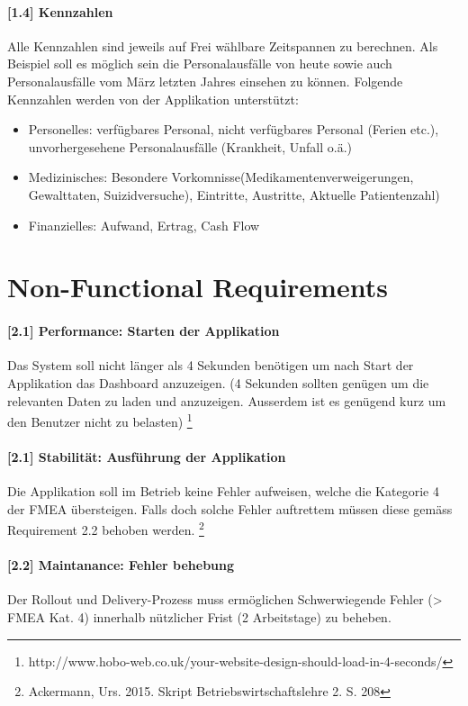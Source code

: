 \documentclass[a4paper]{scrreprt}
\begin{document}
\paragraph{[1.4] Kennzahlen}
Alle Kennzahlen sind jeweils auf Frei wählbare Zeitspannen zu berechnen. Als Beispiel soll es möglich sein die Personalausfälle von heute sowie auch Personalausfälle vom März letzten Jahres einsehen zu können. Folgende Kennzahlen werden von der Applikation unterstützt:
\begin{itemize}
\item Personelles: verfügbares Personal, nicht verfügbares Personal (Ferien etc.), unvorhergesehene Personalausfälle (Krankheit, Unfall o.ä.)\\
\item Medizinisches: Besondere Vorkomnisse(Medikamentenverweigerungen, Gewalttaten, Suizidversuche), Eintritte, Austritte, Aktuelle Patientenzahl) \\
\item Finanzielles: Aufwand, Ertrag, Cash Flow\\
\end{itemize}

\section{Non-Functional Requirements}
\paragraph{[2.1] Performance: Starten der Applikation}
Das System soll nicht länger als 4 Sekunden benötigen um nach Start der Applikation das Dashboard anzuzeigen. (4 Sekunden sollten genügen um die relevanten Daten zu laden und anzuzeigen. Ausserdem ist es genügend kurz um den Benutzer nicht zu belasten)
\footnote{http://www.hobo-web.co.uk/your-website-design-should-load-in-4-seconds/}

\paragraph{[2.1] Stabilität: Ausführung der Applikation}
Die Applikation soll im Betrieb keine Fehler aufweisen, welche die Kategorie 4 der FMEA übersteigen. Falls doch solche Fehler auftrettem müssen diese gemäss Requirement 2.2 behoben werden. 
\footnote{Ackermann, Urs. 2015. Skript Betriebswirtschaftslehre 2. S. 208}

\paragraph{[2.2] Maintanance: Fehler behebung}
Der Rollout und Delivery-Prozess muss ermöglichen Schwerwiegende Fehler (> FMEA Kat. 4) innerhalb nützlicher Frist (2 Arbeitstage) zu beheben.
\end{document}
